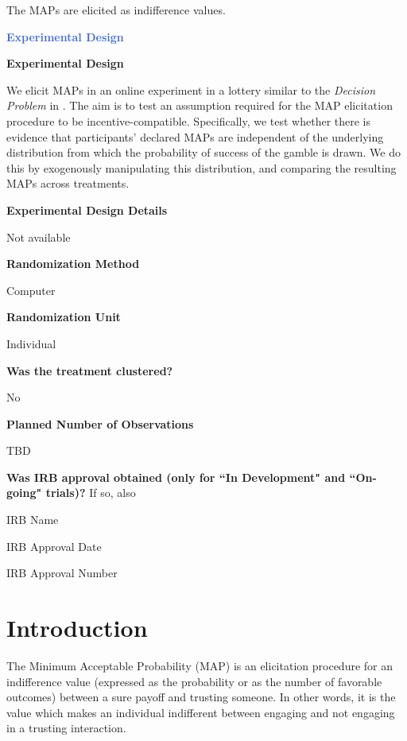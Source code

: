 The MAPs are elicited as indifference values. 



\large \noindent \textcolor{RoyalBlue}{\textbf{Experimental Design}}

\normalsize \noindent \textcolor{NavyBlue}{\textbf{Experimental Design}}

We elicit MAPs in an online experiment in a lottery similar to the \textit{Decision Problem} in \cite{Bohnet2004}.
The aim is to test an assumption required for the MAP elicitation procedure to be incentive-compatible.
Specifically, we test whether there is evidence that participants' declared MAPs are independent of the underlying distribution from which the probability of success of the gamble is drawn.
We do this by exogenously manipulating this distribution, and comparing the resulting MAPs across treatments.

\noindent \textcolor{NavyBlue}{\textbf{Experimental Design Details}}

Not available

\noindent \textcolor{NavyBlue}{\textbf{Randomization Method}}

Computer

\noindent \textcolor{NavyBlue}{\textbf{Randomization Unit}}

Individual

\noindent \textcolor{NavyBlue}{\textbf{Was the treatment clustered?}}

No

\noindent \textcolor{NavyBlue}{\textbf{Planned Number of Observations}}

TBD
    
\noindent \textcolor{NavyBlue}{\textbf{Was IRB approval obtained (only for ``In Development" and ``On-going" trials)?}} If so, also

        IRB Name
        
        IRB Approval Date
        
        IRB Approval Number





\section{Introduction}
The Minimum Acceptable Probability (MAP) is an elicitation procedure for an indifference value (expressed as the probability or as the number of favorable outcomes) between a sure payoff and trusting someone.
In other words, it is the value which makes an individual indifferent between engaging and not engaging in a trusting interaction.

